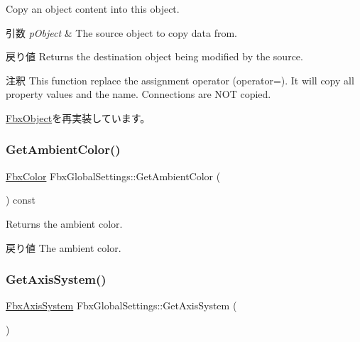 Copy an object content into this object. 
\begin{DoxyParams}{引数}
{\em p\+Object} & The source object to copy data from. \\
\hline
\end{DoxyParams}
\begin{DoxyReturn}{戻り値}
Returns the destination object being modified by the source. 
\end{DoxyReturn}
\begin{DoxyRemark}{注釈}
This function replace the assignment operator (operator=). It will copy all property values and the name. Connections are N\+OT copied. 
\end{DoxyRemark}


\hyperlink{class_fbx_object_a0c0c5adb38284d14bb82c04d54504a3e}{Fbx\+Object}を再実装しています。

\mbox{\label{class_fbx_global_settings_ab44055e13f94e64cd39d4e35127d3ff0}} 
\subsubsection{\texorpdfstring{Get\+Ambient\+Color()}{GetAmbientColor()}}
{\footnotesize\ttfamily \hyperlink{class_fbx_color}{Fbx\+Color} Fbx\+Global\+Settings\+::\+Get\+Ambient\+Color (\begin{DoxyParamCaption}{ }\end{DoxyParamCaption}) const}

Returns the ambient color. \begin{DoxyReturn}{戻り値}
The ambient color. 
\end{DoxyReturn}
\mbox{\label{class_fbx_global_settings_adf26f4742b088b497a5ecec8f458e47d}} 
\subsubsection{\texorpdfstring{Get\+Axis\+System()}{GetAxisSystem()}}
{\footnotesize\ttfamily \hyperlink{class_fbx_axis_system}{Fbx\+Axis\+System} Fbx\+Global\+Settings\+::\+Get\+Axis\+System (\begin{DoxyParamCaption}{ }\end{DoxyParamCaption})}

